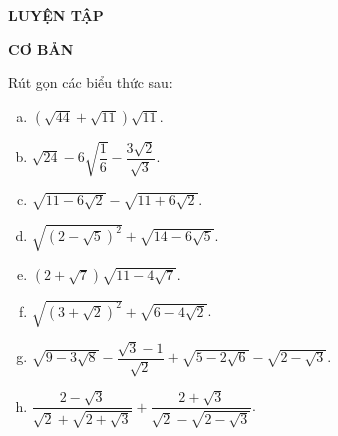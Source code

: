 \begin{center}
	\textbf{LUYỆN TẬP}
\end{center}

\noindent \textbf{CƠ BẢN}
\begin{bt}%
	Rút gọn các biểu thức sau:
	\begin{enumerate}[a)]
		\item $\left(\sqrt{44}+\sqrt{11}\right)\sqrt{11} $.
		\item $\sqrt{24}-6\sqrt{\dfrac{1}{6}}-\dfrac{3\sqrt{2}}{\sqrt{3}} $.
		\item $\sqrt{11-6\sqrt{2}}-\sqrt{11+6\sqrt{2}} $.
		\item $\sqrt{\left(2-\sqrt{5}\right)^2}+\sqrt{14-6\sqrt{5}} $.
		\item $\left(2+\sqrt{7}\right)\sqrt{11-4\sqrt{7}} $.
		\item $\sqrt{\left(3+\sqrt{2}\right)^2}+\sqrt{6-4\sqrt{2}} $.
		\item$\sqrt{9-3\sqrt{8}}-\dfrac{\sqrt{3}-1}{\sqrt{2}}+\sqrt{5-2\sqrt{6}}-\sqrt{2-\sqrt{3}}$.
		\item$\dfrac{2-\sqrt{3}}{\sqrt{2}+\sqrt{2+\sqrt{3}}}+\dfrac{2+\sqrt{3}}{\sqrt{2}-\sqrt{2-\sqrt{3}}}$.
	\end{enumerate}
	\loigiai{
		\begin{enumerate}[a)]
			

\end{enumerate}}
\end{bt}
